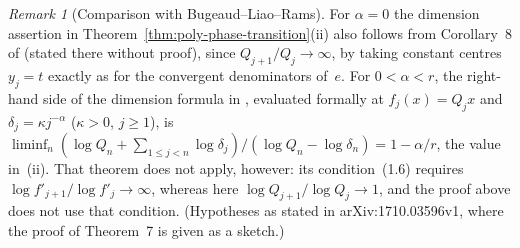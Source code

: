 \documentclass[11pt]{article}
\theoremstyle{definition}
\theoremstyle{remark}
\newtheorem{remark}[theorem]{Remark}
\begin{document}
\begin{remark}[Comparison with Bugeaud--Liao--Rams]\label{rem:poly-BLR}
For $\alpha=0$ the dimension assertion in Theorem~\ref{thm:poly-phase-transition}(ii)
also follows from Corollary~8 of \cite{BLR} (stated there without proof), since
$Q_{j+1}/Q_j\to\infty$, by taking
constant centres $y_j=t$ exactly as for the convergent denominators of~$e$.
For $0<\alpha<r$, the right-hand side of the dimension formula in
\cite[Theorem~7]{BLR}, evaluated formally at $f_j(x)=Q_jx$ and $\delta_j=\kappa j^{-\alpha}$ ($\kappa>0$, $j\ge1$),
is $\liminf_n(\log Q_n+\sum_{1\le j<n}\log\delta_j)/(\log Q_n-\log\delta_n)=1-\alpha/r$,
the value in~(ii). That theorem does not apply, however: its condition~(1.6) requires
$\log f'_{j+1}/\log f'_j\to\infty$, whereas here $\log Q_{j+1}/\log Q_j\to1$, and the
proof above does not use that condition. (Hypotheses as stated in arXiv:1710.03596v1, where the proof of Theorem~7 is
given as a sketch.)
\end{remark}
\end{document}
